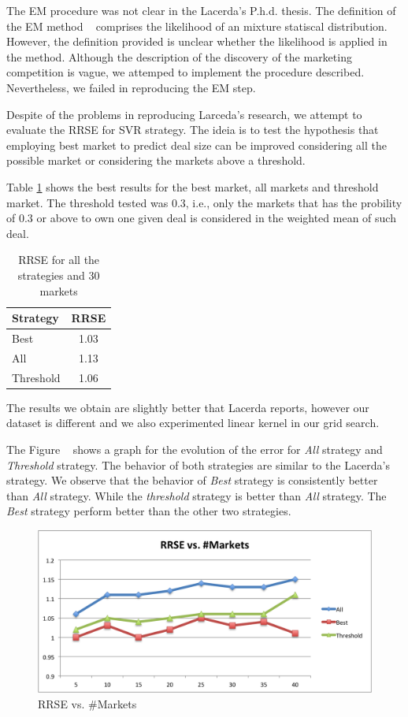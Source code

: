 \documentclass{acm_proc_article-sp}
\begin{document}
The EM procedure was not clear in the Lacerda's P.h.d. thesis. The definition of 
the EM method ~\cite{hastie2009elements} comprises the likelihood 
of an mixture statiscal distribution. However, the definition 
provided is unclear whether the likelihood is applied in the 
method. Although the description of the discovery of the 
marketing competition is vague, we attemped to implement 
the procedure described. Nevertheless, we failed in reproducing 
the EM step.

Despite of the problems in reproducing Larceda's research, we 
attempt to evaluate the  RRSE for SVR strategy. The ideia is 
to test the hypothesis that employing best market to 
predict deal size can be improved considering all the possible 
market or considering the markets above a threshold.

Table \ref{rmsetable} shows the best results for the best market, 
all markets and threshold market. The threshold tested was $0.3$, i.e., 
only the markets that has the probility of $0.3$ or above to 
own one given deal is considered in the weighted mean of such deal.

\begin{table}[H]
    \centering
    \caption{RRSE for all the strategies and 30 markets}
    \label{rmsetable}
    \begin{tabular}{lc} \hline
	Strategy & RRSE \\ \hline \hline
	Best & 1.03\\
        All & 1.13 \\
	Threshold & 1.06 \\ \hline
    \end{tabular}
\end{table}

The results we obtain are slightly better that Lacerda reports, 
however our dataset is different and we also experimented 
linear kernel in our grid search. 

The Figure ~\cite{rrsemarkets} shows a graph for the evolution 
of the error 
for \emph{All} strategy and \emph{Threshold} strategy. The behavior of 
both strategies are similar to the Lacerda's strategy. We observe that 
the behavior of \emph{Best} strategy is consistently better 
than \emph{All} strategy. While the \emph{threshold} strategy is better 
than \emph{All} strategy. The \emph{Best} strategy perform better than 
the other two strategies.

\begin{figure}[H]
    \centering
    \includegraphics[scale=0.5]{rrsemarkets.png}
    \caption{RRSE vs. \#Markets}
    \label{rrsemarkets}
\end{figure}
\end{document}
